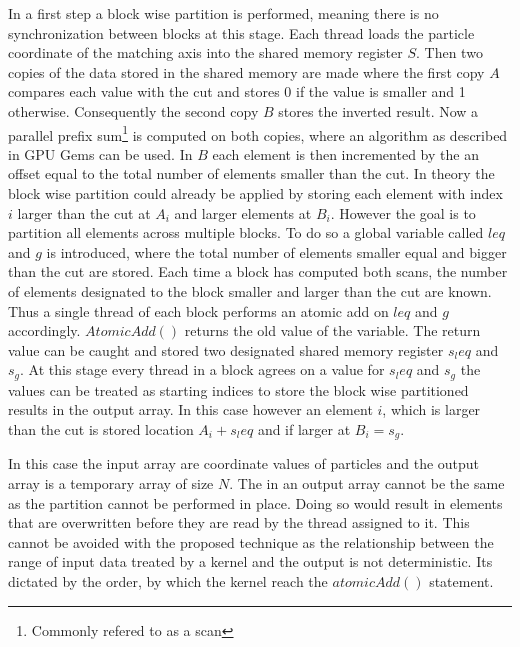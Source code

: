 \documentclass[]{article}
\begin{document}
In a first step a block wise partition is performed, meaning there is no synchronization between blocks at this stage. Each thread loads the particle coordinate of the matching axis into the shared memory register $S$. Then two copies of the data stored in the shared memory are made where the first copy $A$ compares each value with the cut and stores 0 if the value is smaller and 1 otherwise. Consequently the second copy $B$ stores the inverted result. 
Now a parallel prefix sum\footnote{Commonly refered to as a scan} is computed on both copies, where an algorithm as described in GPU Gems \cite{SCAN} can be used. In $B$ each element is then incremented by the an offset equal to the total number of elements smaller than the cut. 
In theory the block wise partition could already be applied by storing each element with index $i$ larger than the cut at $A_i$ and larger elements at $B_i$. 
However the goal is to partition all elements across multiple blocks. To do so a global variable called $leq$ and $g$ is introduced, where the total number of elements smaller equal and bigger than the cut are stored. Each time a block has computed both scans, the number of elements designated to the block smaller and larger than the cut are known. Thus a single thread of each block performs an atomic add on $leq$ and $g$ accordingly. $AtomicAdd()$ returns the old value of the variable. The return value can be caught and stored two designated shared memory register $s_leq$ and $s_g$. 
At this stage every thread in a block agrees on a value for $s_leq$ and $s_g$ the values can be treated as starting indices to store the block wise partitioned results in the output array. In this case however an element $i$, which is larger than the cut is stored location $A_i + s_leq$ and if larger at $B_i = s_g$. 

In this case the input array are coordinate values of particles and the output array is a temporary array of size $N$. The in an output array cannot be the same as the partition cannot be performed in place. Doing so would result in elements that are overwritten before they are read by the thread assigned to it. This cannot be avoided with the proposed technique as the relationship between the range of input data treated by a kernel and the output is not deterministic. Its dictated by the order, by which the kernel reach the $atomicAdd()$ statement. 
\end{document}
